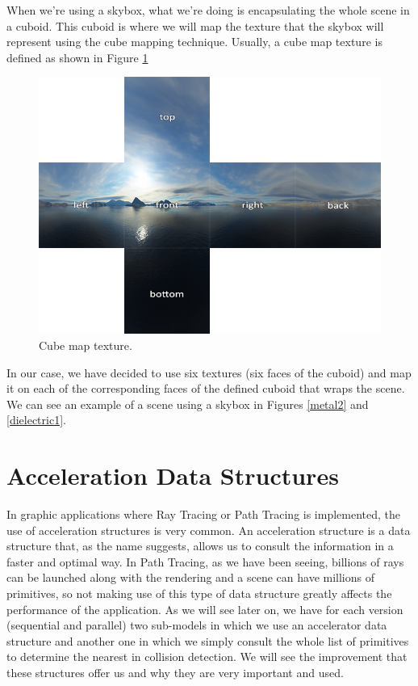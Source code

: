 \documentclass[titlepage,12pt]{report}
\begin{document}
When we're using a skybox, what we're doing is encapsulating the whole scene in a cuboid. This cuboid is where we will map the texture that the skybox will represent using the cube mapping technique. Usually, a cube map texture is defined as shown in Figure \ref{skybox2}

\begin{figure}[H]
	\centering
	\includegraphics[scale=0.45]{media/cubemaps_skybox.png}
	\caption{Cube map texture.}
	\label{skybox2}
\end{figure}

In our case, we have decided to use six textures (six faces of the cuboid) and map it on each of the corresponding faces of the defined cuboid that wraps the scene. We can see an example of a scene using a skybox in Figures \ref{metal2} and \ref{dielectric1}.

\section{Acceleration Data Structures}

In graphic applications where Ray Tracing or Path Tracing is implemented, the use of acceleration structures is very common. An acceleration structure is a data structure that, as the name suggests, allows us to consult the information in a faster and optimal way. In Path Tracing, as we have been seeing, billions of rays can be launched along with the rendering and a scene can have millions of primitives, so not making use of this type of data structure greatly affects the performance of the application. As we will see later on, we have for each version (sequential and parallel) two sub-models in which we use an accelerator data structure and another one in which we simply consult the whole list of primitives to determine the nearest in collision detection. We will see the improvement that these structures offer us and why they are very important and used.
\end{document}
